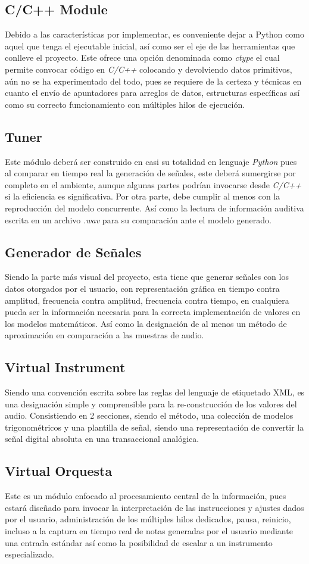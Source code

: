 \documentclass{book}
\begin{document}
	\subsection*{C/C++ Module}
	Debido a las características por implementar, es conveniente dejar a Python como aquel que tenga el ejecutable inicial, así como ser el eje de las herramientas que conlleve el proyecto. Este ofrece una opción denominada como \emph{ctype} el cual permite convocar código en \emph{C/C++} colocando y devolviendo datos primitivos, aún no se ha experimentado del todo, pues se requiere de la certeza y técnicas en cuanto el envío de apuntadores para arreglos de datos, estructuras específicas así como su correcto funcionamiento con múltiples hilos de ejecución.
	\pagebreak\subsection*{Tuner}
	Este módulo deberá ser construido en casi su totalidad en lenguaje \emph{Python} pues al comparar en tiempo real la generación de señales, este deberá sumergirse por completo en el ambiente, aunque algunas partes podrían invocarse desde \emph{C/C++} si la eficiencia es significativa. Por otra parte, debe cumplir al menos con la reproducción del modelo concurrente. Así como la lectura de información auditiva escrita en un archivo \emph{.wav} para su comparación ante el modelo generado. 
	\subsection*{Generador de Señales}
	Siendo la parte más visual del proyecto, esta tiene que generar señales con los datos otorgados por el usuario, con representación gráfica en tiempo contra amplitud, frecuencia contra amplitud, frecuencia contra tiempo, en cualquiera pueda ser la información necesaria para la correcta implementación de valores en los modelos matemáticos. Así como la designación de al menos un método de aproximación en comparación a las muestras de audio.
	\subsection*{Virtual Instrument}
	Siendo una convención escrita sobre las reglas del lenguaje de etiquetado XML, es una designación simple y comprensible para la re-construcción de los valores del audio. Consistiendo en 2 secciones, siendo el método, una colección de modelos trigonométricos y una plantilla de señal, siendo una representación de convertir la señal digital absoluta en una transaccional analógica. 
	\pagebreak\subsection*{Virtual Orquesta}
	Este es un módulo enfocado al procesamiento central de la información, pues estará diseñado para invocar la interpretación de las instrucciones y ajustes dados por el usuario, administración de los múltiples hilos dedicados, pausa, reinicio, incluso a la captura en tiempo real de notas generadas por el usuario mediante una entrada estándar así como la posibilidad de escalar a un instrumento especializado.
\end{document}

